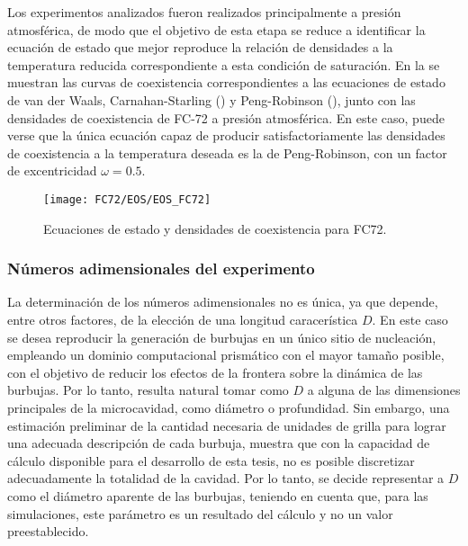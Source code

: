 Los experimentos analizados fueron realizados principalmente a presi\'on atmosf\'erica, de modo que el objetivo de esta etapa se reduce a identificar la ecuaci\'on de estado que mejor reproduce la relaci\'on de densidades a la temperatura reducida correspondiente a esta condici\'on de saturaci\'on. En la  se muestran las curvas de coexistencia correspondientes a las ecuaciones de estado de van der Waals, Carnahan-Starling () y Peng-Robinson (), junto con las densidades de coexistencia de FC-72 a presi\'on atmosf\'erica. En este caso, puede  verse que la \'unica ecuaci\'on capaz de producir satisfactoriamente las densidades de coexistencia a la temperatura deseada es la de Peng-Robinson, con un factor de excentricidad $\omega=0.5$.

\begin{figure}[ht]
	\centering
	\texttt{[image: FC72/EOS/EOS\_FC72]}
	\caption{Ecuaciones de estado y densidades de coexistencia para FC72.}
	\label{fig:eos_fc72}
\end{figure}


\subsubsection{N\'umeros adimensionales del experimento}

La determinaci\'on de los n\'umeros adimensionales no es \'unica, ya que depende, entre otros factores, de la elecci\'on de una longitud caracer\'istica $D$. En este caso se desea reproducir la generaci\'on de burbujas en un \'unico sitio de nucleaci\'on, empleando un dominio computacional prism\'atico con el mayor tama\~no posible, con el objetivo de reducir los efectos de la frontera sobre la din\'amica de las burbujas. Por lo tanto, resulta natural tomar como $D$ a alguna de las dimensiones principales de la microcavidad, como di\'ametro o profundidad. Sin embargo, una estimaci\'on preliminar de la cantidad necesaria de unidades de grilla para lograr una adecuada descripci\'on de cada burbuja, muestra que con la capacidad de c\'alculo disponible para el desarrollo de esta tesis, no es posible discretizar adecuadamente la totalidad de la cavidad. Por lo tanto, se decide representar a $D$ como el di\'ametro aparente de las burbujas, teniendo en cuenta que, para las simulaciones, este par\'ametro es un resultado del c\'alculo y no un valor preestablecido.

